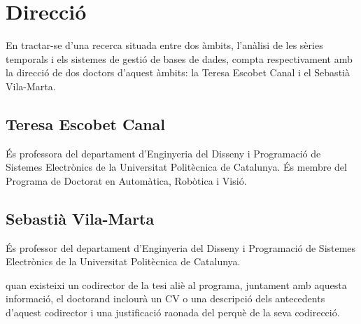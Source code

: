 \chapter{Direcció}


En tractar-se d'una recerca situada entre dos àmbits, l'anàlisi de les
sèries temporals i els sistemes de gestió de bases de dades, compta
respectivament amb la direcció de dos doctors d'aquest àmbits: la
Teresa Escobet Canal i el Sebastià Vila-Marta.

\section{Teresa Escobet Canal}

És professora del departament d'Enginyeria del Disseny i Programació de
Sistemes Electrònics de la Universitat Politècnica de Catalunya. 
És membre del Programa de Doctorat en Automàtica, Robòtica i Visió.



\section{Sebastià Vila-Marta}

És professor del departament d'Enginyeria del Disseny i Programació de
Sistemes Electrònics de la Universitat Politècnica de Catalunya.


quan existeixi un codirector de la tesi aliè al programa, juntament amb aquesta informació, el doctorand inclourà un CV o una descripció dels antecedents d’aquest codirector i una justificació raonada del perquè de la seva codirecció.




